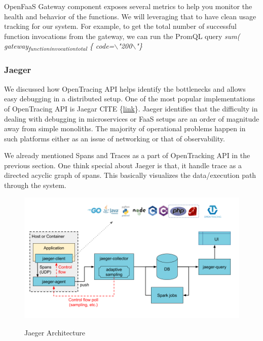 \documentclass[12pt,titlepage]{article}
\begin{document}
OpenFaaS Gateway component exposes several metrics to help you monitor the
health and behavior of the functions. We will leveraging that to have clean
usage tracking for our system. For example, to get the total number of
successful function invocations from the gateway, we can run the PromQL query
\emph{sum( gateway\textsubscript{function}\textsubscript{invocation}\textsubscript{total} \{  code=$\backslash$"200$\backslash$"\}}



\subsubsection{Jaeger}
\label{sec:orgbd1a0db}
We discussed how OpenTracing API helps identify the bottlenecks and allows easy
debugging in a distributed setup. One of the most popular implementations of
OpenTracing API is Jaegar CITE \{\href{https://www.jaegertracing.io/}{link}\}. Jaeger identifies that the difficulty in
dealing with debugging in microservices or FaaS setups are an order of magnitude
away from simple monoliths. The majority of operational problems happen in such platforms
either as an issue of networking or that of observability. 

We already mentioned Spans and Traces as a part of OpenTracking API in the
previous section. One think special about Jaeger is that, it handle trace as a
directed acyclic graph of spans. This basically visualizes the data/execution
path through the system.

\begin{figure}[!h]
    \caption{Jaeger Architecture}
    \centering
    \includegraphics[width=130mm]{./thesis_images/jaeger.png}
    \label{fig:jaeger}
\end{figure}
\end{document}
